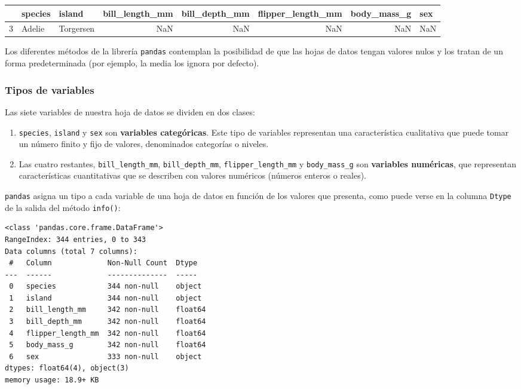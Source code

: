 \documentclass[
  a4paper,
  noprof,
  12pt,
  notoc,
  nosols,
  nobib]{mnye}
\theoremstyle{definition}
\theoremstyle{remark}
\begin{document}
\begin{tabular}{lllrrrrl}
\toprule
{} & species &     island &  bill\_length\_mm &  bill\_depth\_mm &  flipper\_length\_mm &  body\_mass\_g &  sex \\
\midrule
3 &  Adelie &  Torgersen &             NaN &            NaN &                NaN &          NaN &  NaN \\
\bottomrule
\end{tabular}

Los diferentes métodos de la librería \texttt{pandas} contemplan la
posibilidad de que las hojas de datos tengan valores nulos y los tratan
de un forma predeterminada (por ejemplo, la media los ignora por
defecto).

\hypertarget{tipos-de-variables}{%
\subsubsection{Tipos de variables}\label{tipos-de-variables}}

Las siete variables de nuestra hoja de datos se dividen en dos clases:

\begin{enumerate}
\def\labelenumi{\arabic{enumi}.}
\item
  \texttt{species}, \texttt{island} y \texttt{sex} son \textbf{variables
  categóricas}. Este tipo de variables representan una característica
  cualitativa que puede tomar un número finito y fijo de valores,
  denominados categorías o niveles.
\item
  Las cuatro restantes, \texttt{bill\_length\_mm},
  \texttt{bill\_depth\_mm}, \texttt{flipper\_length\_mm} y
  \texttt{body\_mass\_g} son \textbf{variables numéricas}, que
  representan características cuantitativas que se describen con valores
  numéricos (números enteros o reales).
\end{enumerate}

\texttt{pandas} asigna un tipo a cada variable de una hoja de datos en
función de los valores que presenta, como puede verse en la columna
\texttt{Dtype} de la salida del método \texttt{info()}:

\begin{verbatim}
<class 'pandas.core.frame.DataFrame'>
RangeIndex: 344 entries, 0 to 343
Data columns (total 7 columns):
 #   Column             Non-Null Count  Dtype  
---  ------             --------------  -----  
 0   species            344 non-null    object 
 1   island             344 non-null    object 
 2   bill_length_mm     342 non-null    float64
 3   bill_depth_mm      342 non-null    float64
 4   flipper_length_mm  342 non-null    float64
 5   body_mass_g        342 non-null    float64
 6   sex                333 non-null    object 
dtypes: float64(4), object(3)
memory usage: 18.9+ KB
\end{verbatim}
\end{document}
